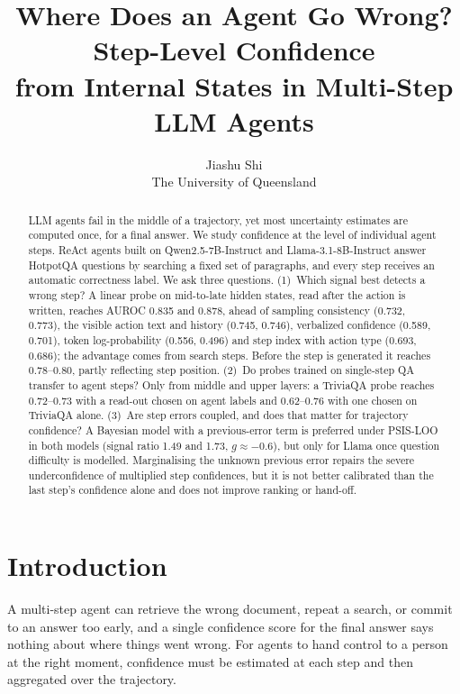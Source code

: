 \documentclass[10pt,twocolumn]{article}
\title{\vspace{-1.2em}\textbf{Where Does an Agent Go Wrong? Step-Level Confidence\\from Internal States in Multi-Step LLM Agents}\vspace{-0.4em}}
\author{Jiashu Shi\\ \small The University of Queensland}
\date{\vspace{-1.5em}}
\begin{document}
\maketitle

\begin{abstract}
LLM agents fail in the middle of a trajectory, yet most uncertainty estimates are computed once, for a final answer.
We study confidence at the level of individual agent steps. ReAct agents built on Qwen2.5-7B-Instruct and
Llama-3.1-8B-Instruct answer HotpotQA questions by searching a fixed set of paragraphs, and every step receives an
automatic correctness label. We ask three questions. (1)~Which signal best detects a wrong step? A linear probe on
mid-to-late hidden states, read after the action is written, reaches AUROC 0.835 and 0.878, ahead of sampling
consistency (0.732, 0.773), the visible action text and history (0.745, 0.746), verbalized confidence (0.589,
0.701), token log-probability (0.556, 0.496) and step index with action type (0.693, 0.686); the advantage comes from
search steps. Before the step is generated it reaches 0.78--0.80, partly reflecting step position. (2)~Do probes
trained on single-step QA transfer to agent steps? Only from middle and upper layers: a TriviaQA probe reaches
0.72--0.73 with a read-out chosen on agent labels and 0.62--0.76 with one chosen on TriviaQA alone. (3)~Are step errors coupled, and does that matter for trajectory
confidence? A Bayesian model with a previous-error term is preferred under PSIS-LOO in both models (signal ratio
1.49 and 1.73, $g\approx-0.6$), but only for Llama once question difficulty is modelled. Marginalising the unknown previous error repairs the severe
underconfidence of multiplied step confidences, but it is not better calibrated than the last step's confidence
alone and does not improve ranking or hand-off.
\end{abstract}

\section{Introduction}
A multi-step agent can retrieve the wrong document, repeat a search, or commit to an answer too early, and a single
confidence score for the final answer says nothing about where things went wrong. For agents to hand control to a
person at the right moment, confidence must be estimated at each step and then aggregated over the trajectory.
\end{document}
